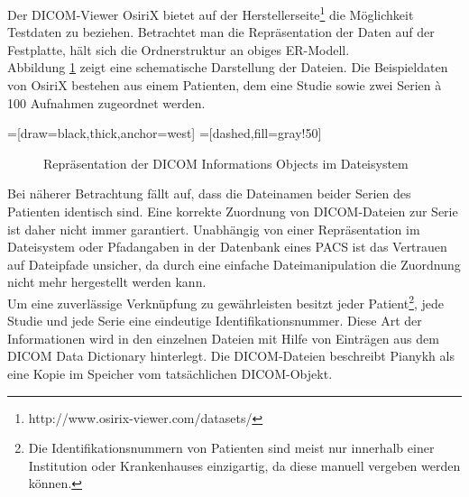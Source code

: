 Der DICOM-Viewer OsiriX bietet auf der Herstellerseite\footnote{http://www.osirix-viewer.com/datasets/} die Möglichkeit Testdaten zu beziehen. Betrachtet man die Repräsentation der Daten auf der Festplatte, hält sich die Ordnerstruktur an obiges ER-Modell.\\
Abbildung \ref{filesystemrep} zeigt eine schematische Darstellung der Dateien. Die Beispieldaten von OsiriX bestehen aus einem Patienten, dem eine Studie sowie zwei Serien à 100 Aufnahmen zugeordnet werden.

=[draw=black,thick,anchor=west]
=[dashed,fill=gray!50]
\begin{figure}[htbp]
\centering
\caption{Repräsentation der DICOM Informations Objects im Dateisystem}
\label{filesystemrep}
\end{figure}

Bei näherer Betrachtung fällt auf, dass die Dateinamen beider Serien des Patienten identisch sind. Eine korrekte Zuordnung von DICOM-Dateien zur Serie ist daher nicht immer garantiert. Unabhängig von einer Repräsentation im Dateisystem oder Pfadangaben in der Datenbank eines PACS ist das Vertrauen auf Dateipfade unsicher, da durch eine einfache Dateimanipulation die Zuordnung nicht mehr hergestellt werden kann.\\
Um eine zuverlässige Verknüpfung zu gewährleisten besitzt jeder Patient\footnote{Die Identifikationsnummern von Patienten sind meist nur innerhalb einer Institution oder Krankenhauses einzigartig, da diese manuell vergeben werden können\cite[5.6.2]{pianykh:dicom}.}, jede Studie und jede Serie eine eindeutige Identifikationsnummer. Diese Art der Informationen wird in den einzelnen Dateien mit Hilfe von Einträgen aus dem DICOM Data Dictionary\cite{dicom:dd} hinterlegt. Die DICOM-Dateien beschreibt Pianykh \cite[S. 47]{pianykh:dicom}
als eine Kopie im Speicher vom tatsächlichen DICOM-Objekt.

